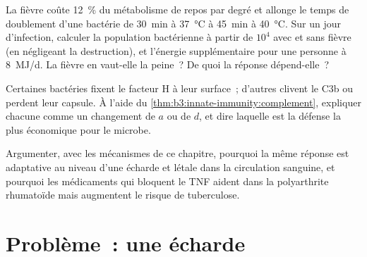 \begin{exercise}[$\star\star\star$]\label{exo:b3:innate-immunity:10}
La fièvre coûte \qty{12}{\%} du métabolisme de repos par degré et
allonge le temps de doublement d'une bactérie de \qty{30}{min} à
\qty{37}{\celsius} à \qty{45}{min} à \qty{40}{\celsius}. Sur un jour
d'infection, calculer la population bactérienne à partir de $10^{4}$
avec et sans fièvre (en négligeant la destruction), et l'énergie
supplémentaire pour une personne à \qty{8}{MJ/d}. La fièvre en vaut-elle
la peine~? De quoi la réponse dépend-elle~?
\end{exercise}

\begin{exercise}[$\star\star\star$]\label{exo:b3:innate-immunity:11}
Certaines bactéries fixent le facteur H à leur surface~; d'autres
clivent le C3b ou perdent leur capsule. À l'aide du
\cref{thm:b3:innate-immunity:complement}, expliquer chacune comme un
changement de $a$ ou de $d$, et dire laquelle est la défense la plus
économique pour le microbe.
\end{exercise}

\begin{exercise}[$\star\star\star$]\label{exo:b3:innate-immunity:12}
Argumenter, avec les mécanismes de ce chapitre, pourquoi la même réponse
est adaptative au niveau d'une écharde et létale dans la circulation
sanguine, et pourquoi les médicaments qui bloquent le TNF aident dans la
polyarthrite rhumatoïde mais augmentent le risque de tuberculose.
\end{exercise}

\section{Problème~: une écharde}


